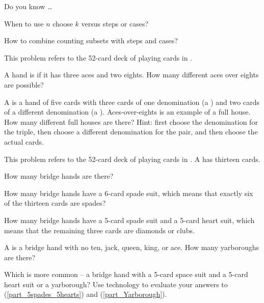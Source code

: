 \begin{exer}[\exerR] %
\label{exer_dyk_combining_counting}
    Do you know \ldots
        \begin{exerpart}
            \item When to use $n$ choose $k$ versus steps or cases?
            \item How to combine counting subsets with steps and cases?
        \end{exerpart}
\end{exer}

\begin{exer} [\exerE] %
\label{exer_full house}
This problem refers to the 52-card deck of playing cards in .
    \begin{exerpart}
        \item  A hand is  if it has three aces and two eights.  How many different aces over eights are possible? 
        \item  A  is a hand of five cards with three cards of one denomination (a ) and two cards of a different denomination (a ).  Aces-over-eights is an example of a full house.  How many different full houses are there?  Hint: first choose the denomination for the triple, then choose a different denomination for the pair, and then choose the actual cards.
    \end{exerpart}
\end{exer}

\begin{exer} [\exerE] %
\label{exer_bridge_hands}
This problem refers to the 52-card deck of playing cards in .  A  has thirteen cards.
    \begin{exerpart}
        \item How many bridge hands are there?
        \item How many bridge hands have a 6-card spade suit, which means that exactly six of the thirteen cards are spades? 
        \item \label{part_5spades_5hearts} How many bridge hands have a 5-card spade suit and a 5-card heart suit, which means that the remaining three cards are diamonds or clubs.
        \item \label{part_Yarborough} A  is a bridge hand with no ten, jack, queen, king, or ace.  How many yarboroughs are there?  
        \item Which is more common -- a bridge hand with a 5-card space suit and a 5-card heart suit or a yarborough?  Use technology to evaluate your answers to (\ref{part_5spades_5hearts}) and (\ref{part_Yarborough}).
    \end{exerpart}
\end{exer}

